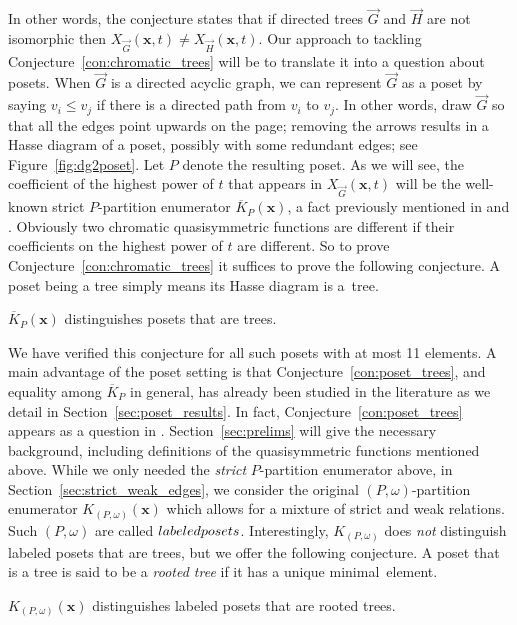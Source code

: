 \documentclass[ALCO,Unicode,published]{cedram}
\newcommand{\diG}{\overrightarrow{G}}
\newcommand{\diH}{\overrightarrow{H}}
\newcommand{\x}{\mathbf{x}}
\newcommand{\om}{\omega}
\newcommand{\KK}[1]{\overline{K}_{#1}}
\newcommand{\kpw}{K_{(P,\om)}}
\begin{document}
In other words, the conjecture states that if directed trees
$\diG$ and $\diH$ are not isomorphic then $X_{\diG}(\x, t) \neq X_{\diH}(\x, t)$.  Our approach to tackling Conjecture~\ref{con:chromatic_trees} will be to translate it into a question about posets.  When $\diG$ is a directed acyclic graph, we can represent $\diG$ as a poset  by saying $v_i \leq v_j$ if there is a directed path from $v_i$ to $v_j$.  In other words, draw $\diG$ so that all the edges point upwards on the page; removing the arrows results in a Hasse diagram of a poset, possibly with some redundant edges; see Figure~\ref{fig:dg2poset}.  Let $P$ denote the resulting poset.  As we will see, the coefficient of the highest power of $t$ that appears in $X_{\diG}(\x, t)$ will be the well-known strict $P$-partition enumerator $\KK{P}(\x)$, a fact previously mentioned in \cite[Theorem~7.4]{AlSu21} and \cite[p.~11]{Ell17+}.   Obviously two chromatic quasisymmetric functions are different if their coefficients on the highest power of $t$ are different.  So to prove Conjecture~\ref{con:chromatic_trees} it suffices to prove the following conjecture.  A poset being a tree simply means its Hasse diagram is a~tree.

\begin{conjecture}\label{con:poset_trees}
$\KK{P}(\x)$ distinguishes posets that are trees. 
\end{conjecture}

We have verified this conjecture for all such posets with at most 11 elements.  A main advantage of the poset setting is that Conjecture~\ref{con:poset_trees}, and equality among $\KK{P}$ in general, has already been studied in the literature as we detail in Section~\ref{sec:poset_results}.  In fact, Conjecture~\ref{con:poset_trees} appears as a question in \cite[Problem~6.1]{HaTs17}.  Section~\ref{sec:prelims} will give the necessary background, including definitions of the quasisymmetric functions mentioned above.  While we only needed the  \emph{strict} $P$-partition enumerator above, in Section~\ref{sec:strict_weak_edges}, we consider the original $(P,\om)$-partition enumerator $\kpw(\x)$ which allows for a mixture of strict and weak relations.  Such $(P,\om)$ are called $\emph{labeled posets}$.  Interestingly, $\kpw$ does \emph{not} distinguish labeled posets that are trees, but we offer the following conjecture.  A poset that is a tree is said to be a \emph{rooted tree} if it has a unique minimal~element.

\begin{conjecture}\label{con:labeled_rooted_trees}
$\kpw(\x)$ distinguishes labeled posets that are rooted trees.
\end{conjecture}
 
\end{document}
